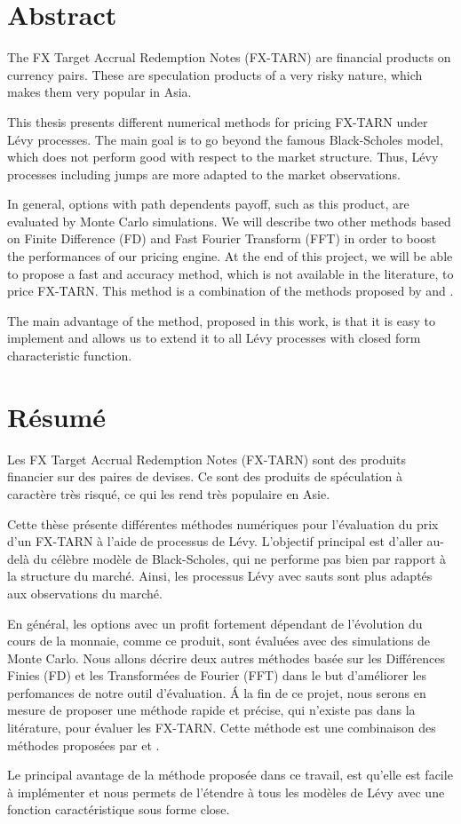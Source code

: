 
%
\chapter*{Abstract}
\label{sec:abstract}

The FX Target Accrual Redemption Notes (FX-TARN) are financial products on currency pairs. These are speculation products of a very risky nature, which makes them very popular in Asia. 

This thesis presents different numerical methods for pricing FX-TARN under L\'evy processes. The main goal is to go beyond the famous Black-Scholes model, which does not perform good with respect to the market structure. Thus, L\'evy processes including jumps are more adapted to the market observations.

In general, options with path dependents payoff, such as this product, are evaluated by Monte Carlo simulations. We will describe two other methods based on Finite Difference (FD) and Fast Fourier Transform (FFT) in order to boost the performances of our pricing engine. At the end of this project, we will be able to propose a fast and accuracy method, which is not available in the literature, to price FX-TARN. This method is a combination of the methods proposed by \citeauthor{LS15} \citeyearpar{LS15} \cite{LS15} and \citeauthor{Lor+08} \citeyearpar{Lor+08} \cite{Lor+08}. 

The main advantage of the method, proposed in this work, is that it is easy to implement and allows us to extend it to all L\'evy processes with closed form characteristic function.

\chapter*{Résumé}

Les FX Target Accrual Redemption Notes (FX-TARN) sont des produits financier sur des paires de devises. Ce sont des produits de spéculation à caractère très risqué, ce qui les rend très populaire en Asie.

Cette thèse présente différentes méthodes numériques pour l'évaluation du prix d'un FX-TARN à l'aide de processus de Lévy. L'objectif principal est d'aller au-delà du célèbre modèle de Black-Scholes, qui ne performe pas bien par rapport à la structure du marché. Ainsi, les processus Lévy avec sauts sont plus adaptés aux observations du marché.

En général, les options avec un profit fortement dépendant de l'évolution du cours de la monnaie, comme ce produit, sont évaluées avec des simulations de Monte Carlo. Nous allons décrire deux autres méthodes basée sur les Différences Finies (FD) et les Transformées de Fourier (FFT) dans le but d'améliorer les perfomances de notre outil d'évaluation. \'A la fin de ce projet, nous serons en mesure de proposer une méthode rapide et précise, qui n'existe pas dans la litérature, pour évaluer les FX-TARN. Cette méthode est une combinaison des méthodes proposées par \citeauthor{LS15} \citeyearpar{LS15} \cite{LS15} et \citeauthor{Lor+08} \citeyearpar{Lor+08} \cite{Lor+08}. 

Le principal avantage de la méthode proposée dans ce travail, est qu'elle est facile à implémenter et nous permets de l'étendre à tous les modèles de Lévy avec une fonction caractéristique sous forme close.


